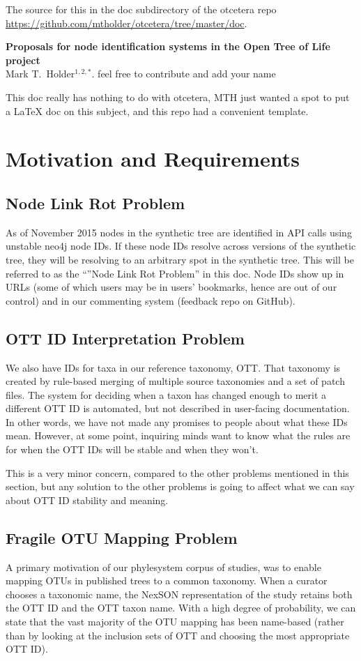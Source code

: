\documentclass[11pt]{article}
\newcommand{\nodeLinkRot}{Node Link Rot Problem\xspace}
\newcommand{\ottIdInterpretation}{OTT ID Interpretation Problem\xspace}
\newcommand{\fragileOTUMapping}{Fragile OTU Mapping Problem\xspace}
\begin{document}
The source for this in the doc subdirectory of the otcetera
    repo \url{https://github.com/mtholder/otcetera/tree/master/doc}.
\begin{center}
    {\bf Proposals for node identification systems in the Open Tree of Life project} \\
{Mark T.~Holder$^{1,2,\ast}$. feel free to contribute and add your name}
\end{center}
This doc really has nothing to do with otcetera, MTH just wanted a spot to
put a \LaTeX\xspace doc on this subject, and this repo had a convenient template.

\tableofcontents
\section{Motivation and Requirements}
\subsection{\nodeLinkRot}
As of November 2015 nodes in the synthetic tree are identified in API calls
    using unstable neo4j node IDs.
If these node IDs resolve across versions of the synthetic tree, they will be
    resolving to an arbitrary spot in the synthetic tree.
This will be referred to as the ``''\nodeLinkRot'' in this doc.
Node IDs show up in URLs (some of which users may be in users' bookmarks, hence
    are out of our control) and in our commenting system (feedback repo on GitHub).

\subsection{\ottIdInterpretation}
We also have IDs for taxa in our reference taxonomy, OTT.
That taxonomy is created by rule-based merging of multiple source taxonomies and
    a set of patch files.
The system for deciding when a taxon has changed enough to merit a different OTT ID
    is automated, but not described in user-facing documentation.
In other words, we have not made any promises to people about what these IDs mean.
However, at some point, inquiring minds want to know what the rules are for when
  the OTT IDs will be stable and when they won't.

This is a very minor concern, compared to the other problems mentioned in this section,
  but any solution to the other problems is going to affect what we can say 
  about OTT ID stability and meaning.

\subsection{\fragileOTUMapping}
A primary motivation of our phylesystem corpus of studies, was to enable
  mapping OTUs in published trees to a common taxonomy.
When a curator chooses a taxonomic name, the NexSON representation of the study
  retains both the OTT ID and the OTT taxon name.
With a high degree of probability, we can state that the vast majority of the 
  OTU mapping has been name-based (rather than by looking at the inclusion
    sets of OTT and choosing the most appropriate OTT ID).
\end{document}
